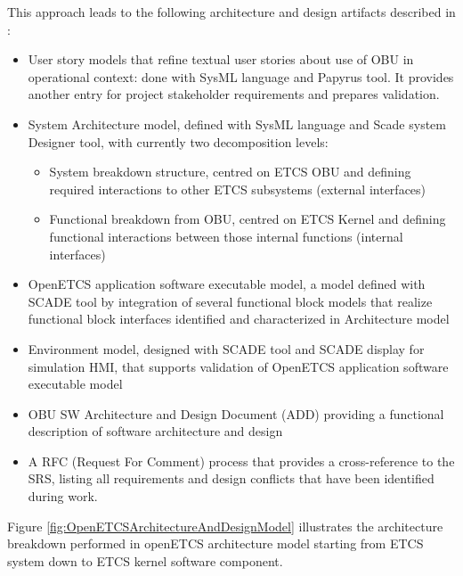 \documentclass[11pt]{template/openetcs_report}
\begin{document}
This approach leads to the following architecture and design artifacts described in \cite{ArchitectureDesignSpecification} :
\begin{itemize} 
\item User story models that refine textual user stories about use of OBU in operational context: done with SysML language and Papyrus tool. It provides another entry for project stakeholder requirements and prepares validation.
\item System Architecture model, defined with SysML language and Scade system Designer tool, with currently two decomposition levels: 
		\begin{itemize} \item System breakdown structure, centred on ETCS OBU and defining required interactions to other ETCS subsystems (external interfaces)
		\item Functional breakdown from OBU, centred on ETCS Kernel and defining functional interactions between those internal functions (internal interfaces)
		\end{itemize} 

\item OpenETCS application software executable model, a model defined with SCADE tool by integration of several functional block models that realize functional block interfaces identified and characterized in Architecture model
\item Environment model, designed with SCADE tool and SCADE display for simulation HMI, that supports validation of OpenETCS application software executable model
\item OBU SW Architecture and Design Document (ADD) providing a functional description of software architecture and design
\item A RFC (Request For Comment) process that provides a cross-reference to the SRS, listing
all requirements and design conflicts that have been identified during work. 

\end{itemize}

Figure \ref{fig:OpenETCSArchitectureAndDesignModel} illustrates the architecture breakdown performed in openETCS architecture model starting from ETCS system down to ETCS kernel software component.
\end{document}
